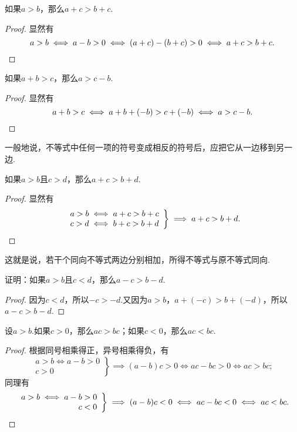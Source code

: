 \begin{theorem}
如果\(a>b\)，那么\(a+c>b+c\).
\begin{proof}
显然有\[
a>b
\iff a-b>0
\iff (a+c)-(b+c)>0
\iff a+c>b+c.
\qedhere
\]
\end{proof}
\end{theorem}

\begin{corollary}
如果\(a+b>c\)，那么\(a>c-b\).
\begin{proof}
显然有\[
a+b>c
\iff a+b+(-b)>c+(-b)
\iff a>c-b.
\qedhere
\]
\end{proof}
\end{corollary}
一般地说，不等式中任何一项的符号变成相反的符号后，应把它从一边移到另一边.

\begin{corollary}
如果\(a>b\)且\(c>d\)，那么\(a+c>b+d\).
\begin{proof}
显然有\[
\left. \begin{array}{c}
a>b \iff a+c>b+c \\
c>d \iff b+c>b+d
\end{array} \right\}
\implies a+c>b+d.
\qedhere
\]
\end{proof}
\end{corollary}
这就是说，若干个同向不等式两边分别相加，所得不等式与原不等式同向.

\begin{example}
证明：如果\(a > b\)且\(c < d\)，那么\(a - c > b - d\).
\begin{proof}
因为\(c < d\)，所以\(-c > -d\).又因为\(a > b\)，\(a + (-c) > b + (-d)\)，所以\(a - c > b - d\).
\end{proof}
\end{example}

\begin{theorem}
设\(a>b\).如果\(c>0\)，那么\(ac>bc\)；如果\(c<0\)，那么\(ac<bc\).
\begin{proof}
根据同号相乘得正，异号相乘得负，有\[
\left. \begin{array}{r}
a>b \iff a-b>0 \\
c>0
\end{array} \right\}
\implies (a-b)c>0
\iff ac-bc>0
\iff ac>bc;
\]同理有\[
\left. \begin{array}{r}
a>b \iff a-b> 0 \\
c<0
\end{array} \right\}
\implies (a-b)c<0
\iff ac-bc<0
\iff ac<bc.
\qedhere
\]
\end{proof}
\end{theorem}

